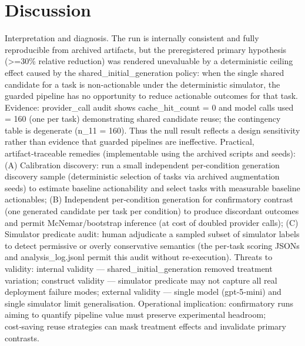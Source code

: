 \documentclass[conference]{IEEEtran}
\begin{document}
\section{Discussion}
Interpretation and diagnosis. The run is internally consistent and fully reproducible from archived artifacts, but the preregistered primary hypothesis (>=30\% relative reduction) was rendered unevaluable by a deterministic ceiling effect caused by the shared\_initial\_generation policy: when the single shared candidate for a task is non‑actionable under the deterministic simulator, the guarded pipeline has no opportunity to reduce actionable outcomes for that task. Evidence: provider\_call audit shows cache\_hit\_count = 0 and model calls used = 160 (one per task) demonstrating shared candidate reuse; the contingency table is degenerate (n\_11 = 160). Thus the null result reflects a design sensitivity rather than evidence that guarded pipelines are ineffective. Practical, artifact‑traceable remedies (implementable using the archived scripts and seeds): (A) Calibration discovery: run a small independent per‑condition generation discovery sample (deterministic selection of tasks via archived augmentation seeds) to estimate baseline actionability and select tasks with measurable baseline actionables; (B) Independent per‑condition generation for confirmatory contrast (one generated candidate per task per condition) to produce discordant outcomes and permit McNemar/bootstrap inference (at cost of doubled provider calls); (C) Simulator predicate audit: human adjudicate a sampled subset of simulator labels to detect permissive or overly conservative semantics (the per‑task scoring JSONs and analysis\_log.jsonl permit this audit without re‑execution). Threats to validity: internal validity --- shared\_initial\_generation removed treatment variation; construct validity --- simulator predicate may not capture all real deployment failure modes; external validity --- single model (gpt‑5‑mini) and single simulator limit generalisation. Operational implication: confirmatory runs aiming to quantify pipeline value must preserve experimental headroom; cost‑saving reuse strategies can mask treatment effects and invalidate primary contrasts.
\end{document}
